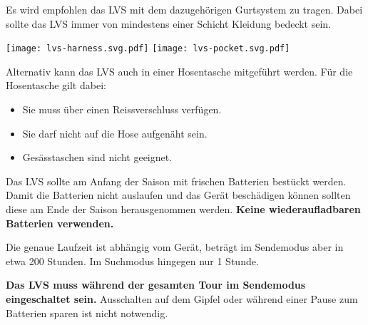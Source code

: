 \newcolumn

Es wird empfohlen das LVS mit dem dazugehörigen Gurtsystem zu tragen.
Dabei sollte das LVS immer von mindestens einer Schicht Kleidung bedeckt sein.

\begin{center}
  \texttt{[image: lvs-harness.svg.pdf]}
  \texttt{[image: lvs-pocket.svg.pdf]}
\end{center}

Alternativ kann das LVS auch in einer Hosentasche mitgeführt werden.
Für die Hosentasche gilt dabei:

\begin{itemize}
  \item{Sie muss über einen Reissverschluss verfügen.}
  \item{Sie darf nicht auf die Hose aufgenäht sein.}
  \item{Gesässtaschen sind nicht geeignet.}
\end{itemize}

Das LVS sollte am Anfang der Saison mit frischen Batterien bestückt werden.
Damit die Batterien nicht auslaufen und das Gerät beschädigen können sollten diese am Ende der Saison herausgenommen werden.
\textbf{Keine wiederaufladbaren Batterien verwenden.}

Die genaue Laufzeit ist abhängig vom Gerät, beträgt im Sendemodus aber in etwa 200 Stunden.
Im Suchmodus hingegen nur 1 Stunde.

\textbf{Das LVS muss während der gesamten Tour im Sendemodus eingeschaltet sein.}
Ausschalten auf dem Gipfel oder während einer Pause zum Batterien sparen ist nicht notwendig.

\newcolumn
